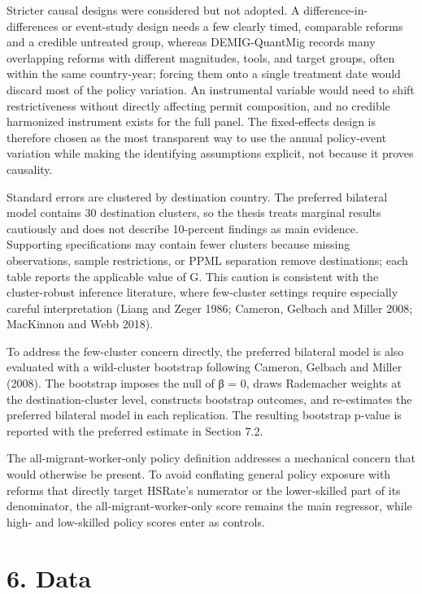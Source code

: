 \documentclass[11pt,a4paper]{article}
\begin{document}
Stricter causal designs were considered but not adopted. A
difference-in-differences or event-study design needs a few clearly
timed, comparable reforms and a credible untreated group, whereas
DEMIG-QuantMig records many overlapping reforms with different
magnitudes, tools, and target groups, often within the same
country-year; forcing them onto a single treatment date would discard
most of the policy variation. An instrumental variable would need to
shift restrictiveness without directly affecting permit composition, and
no credible harmonized instrument exists for the full panel. The
fixed-effects design is therefore chosen as the most transparent way to
use the annual policy-event variation while making the identifying
assumptions explicit, not because it proves causality.

Standard errors are clustered by destination country. The preferred
bilateral model contains 30 destination clusters, so the thesis treats
marginal results cautiously and does not describe 10-percent findings as
main evidence. Supporting specifications may contain fewer clusters
because missing observations, sample restrictions, or PPML separation
remove destinations; each table reports the applicable value of G. This
caution is consistent with the cluster-robust inference literature,
where few-cluster settings require especially careful interpretation
(Liang and Zeger 1986; Cameron, Gelbach and Miller 2008; MacKinnon and
Webb 2018).

To address the few-cluster concern directly, the preferred bilateral
model is also evaluated with a wild-cluster bootstrap following Cameron,
Gelbach and Miller (2008). The bootstrap imposes the null of β = 0,
draws Rademacher weights at the destination-cluster level, constructs
bootstrap outcomes, and re-estimates the preferred bilateral model in
each replication. The resulting bootstrap p-value is reported with the
preferred estimate in Section 7.2.

The all-migrant-worker-only policy definition addresses a mechanical
concern that would otherwise be present. To avoid conflating general
policy exposure with reforms that directly target HSRate's numerator or
the lower-skilled part of its denominator, the all-migrant-worker-only
score remains the main regressor, while high- and low-skilled policy
scores enter as controls.

\endgroup
\clearpage
\section{6. Data}\label{data}
\end{document}
